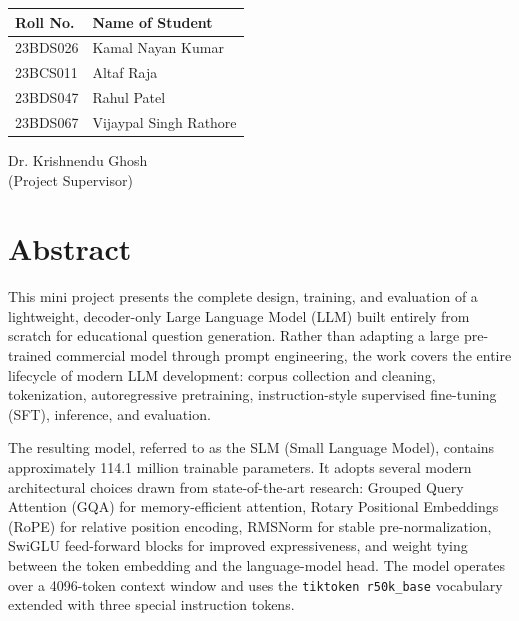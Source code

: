 \documentclass[12pt]{article}
\begin{document}
\begin{table}[h]
  \centering
  \begin{tabular}{ll}
    \toprule
    \textbf{Roll No.} & \textbf{Name of Student} \\
    \midrule
    23BDS026 & Kamal Nayan Kumar \\
    23BCS011 & Altaf Raja \\
    23BDS047 & Rahul Patel \\
    23BDS067 & Vijaypal Singh Rathore \\
    \bottomrule
  \end{tabular}
\end{table}

\vfill
\begin{flushright}
  Dr. Krishnendu Ghosh\\
  (Project Supervisor)
\end{flushright}

\newpage
{}
\setcounter{page}{1}
\tableofcontents
\newpage
\listoffigures
\newpage
\listoftables
\newpage

\section*{Abstract}

This mini project presents the complete design, training, and evaluation of a lightweight, decoder-only Large Language Model (LLM) built entirely from scratch for educational question generation. Rather than adapting a large pre-trained commercial model through prompt engineering, the work covers the entire lifecycle of modern LLM development: corpus collection and cleaning, tokenization, autoregressive pretraining, instruction-style supervised fine-tuning (SFT), inference, and evaluation.

The resulting model, referred to as the SLM (Small Language Model), contains approximately 114.1 million trainable parameters. It adopts several modern architectural choices drawn from state-of-the-art research: Grouped Query Attention (GQA) for memory-efficient attention, Rotary Positional Embeddings (RoPE) for relative position encoding, RMSNorm for stable pre-normalization, SwiGLU feed-forward blocks for improved expressiveness, and weight tying between the token embedding and the language-model head. The model operates over a 4096-token context window and uses the \texttt{tiktoken r50k\_base} vocabulary extended with three special instruction tokens.
\end{document}
